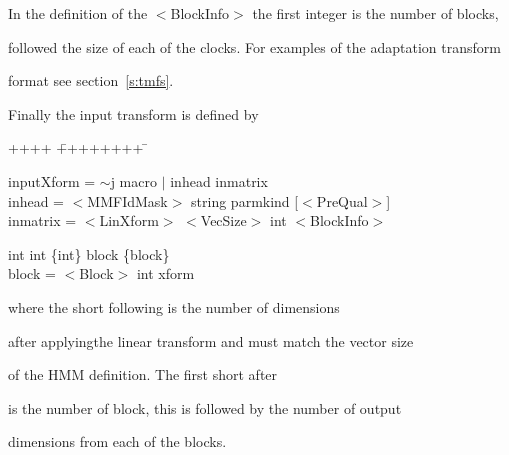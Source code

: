\noindent


In the definition of the $<$BlockInfo$>$ the first integer is the number of blocks,


followed the size of each of the clocks. For examples of the adaptation transform


format see section~\ref{s:tmfs}.





Finally the input transform is defined by


{\sf


\begin{tabbing}


++++ \= ++++++++ \=  \kill


\>  inputXform  = \> $\sim$j macro $|$ inhead inmatrix\\


\>  inhead      = \> $<$MMFIdMask$>$ string parmkind [$<$PreQual$>$]\\


\>  inmatrix    = \> $<$LinXform$>$ $<$VecSize$>$ int $<$BlockInfo$>$ 


int int \{int\} block \{block\}\\


\>  block       = \> $<$Block$>$ int xform


\end{tabbing}


}


\noindent


where the {\sf short} following  is the number of dimensions


after applyingthe linear transform and must match the vector size


of the HMM definition. The first {\sf short} after 


is the number of block, this is followed by the number of output


dimensions from each of the blocks.
















